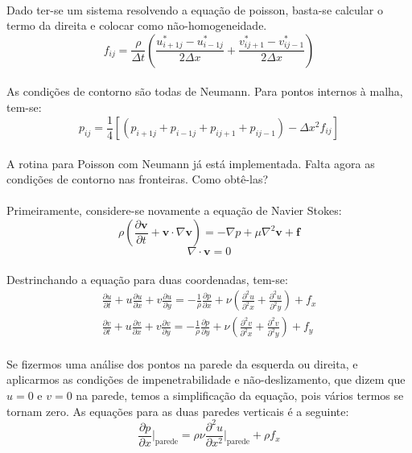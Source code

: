 \documentclass[a4paper,11pt]{article}
\begin{document}
\paragraph{} Dado ter-se um sistema resolvendo a equação de poisson, basta-se calcular o termo da direita e colocar como não-homogeneidade.
\begin{equation}
f_{ij}=\frac{\rho}{\Delta t}\left( \frac{u_{i+1j}^*-u_{i-1j}^*}{2\Delta x}+\frac{v_{ij+1}^*-v_{ij-1}^*}{2\Delta x}\right)
\end{equation}
\paragraph{} As condições de contorno são todas de Neumann. Para pontos internos à malha, tem-se:
\begin{equation}
p_{ij}=\frac{1}{4}[(p_{i+1j}+p_{i-1j}+p_{ij+1}+p_{ij-1})-\Delta x^2 f_{ij}]
\end{equation}
\paragraph{} A rotina para Poisson com Neumann já está implementada. Falta agora
as condições de contorno nas fronteiras. Como obtê-las?
\paragraph{} Primeiramente, considere-se novamente a equação de Navier Stokes:
\[\rho\left( \frac{\partial \textbf{v}}{\partial t}+\textbf{v}\cdot\nabla\textbf{v}\right)=-\nabla p+\mu\nabla^2\textbf{v}+\textbf{f}\]
\[\nabla\cdot\textbf{v}=0\]
\paragraph{} Destrinchando a equação para duas coordenadas, tem-se:
\begin{eqnarray}
\frac{\partial u}{\partial t}+u\frac{\partial u}{\partial x}+v\frac{\partial
u}{\partial y}=-\frac{1}{\rho}\frac{\partial p}{\partial
x}+\nu\left(\frac{\partial^2 u}{\partial^2 x}+\frac{\partial^2 u}{\partial^2
y}\right)+f_x\\
\frac{\partial v}{\partial t}+u\frac{\partial v}{\partial x}+v\frac{\partial
v}{\partial y}=-\frac{1}{\rho}\frac{\partial p}{\partial
y}+\nu\left(\frac{\partial^2 v}{\partial^2 x}+\frac{\partial^2 v}{\partial^2
y}\right)+f_y
\end{eqnarray}
\paragraph{} Se fizermos uma análise dos pontos na parede da esquerda ou
direita, e aplicarmos as condições de impenetrabilidade e não-deslizamento, que
dizem que $u=0$ e $v=0$ na parede, temos a simplificação da equação, pois vários
termos se tornam zero. As equações para as duas paredes verticais é a seguinte:
\begin{equation}
\frac{\partial p}{\partial x}\Bigg|_{\textrm{parede}}=\rho\nu\frac{\partial^2
u}{\partial x^2}\Bigg|_{\textrm{parede}}+\rho f_x
\end{equation}
\end{document}
